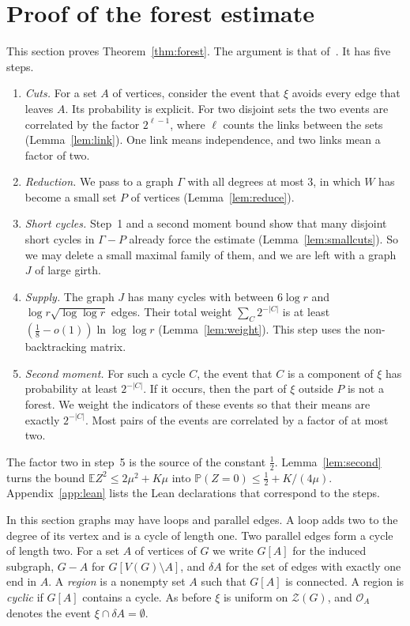 \documentclass[11pt]{article}
\theoremstyle{definition}
\theoremstyle{remark}
\newcommand{\Z}{\mathcal{Z}}
\newcommand{\PP}{\mathbb{P}}
\newcommand{\EE}{\mathbb{E}}
\newcommand{\sm}{\setminus}
\newcommand{\half}{\tfrac12}
\newcommand{\cO}{\mathcal{O}}
\numberwithin{equation}{section}
\begin{document}
\section{Proof of the forest estimate}\label{sec:forest}

This section proves Theorem~\ref{thm:forest}. The argument is that of~\cite{KNT}. It has five steps.
\begin{enumerate}
\item \emph{Cuts.} For a set $A$ of vertices, consider the event that $\xi$ avoids every edge that
leaves $A$. Its probability is explicit. For two disjoint sets the two events are correlated by the
factor $2^{\ell-1}$, where $\ell$ counts the links between the sets (Lemma~\ref{lem:link}). One link
means independence, and two links mean a factor of two.
\item \emph{Reduction.} We pass to a graph $\Gamma$ with all degrees at most $3$, in which $W$ has
become a small set $P$ of vertices (Lemma~\ref{lem:reduce}).
\item \emph{Short cycles.} Step~1 and a second moment bound show that many disjoint short cycles in
$\Gamma-P$ already force the estimate (Lemma~\ref{lem:smallcuts}). So we may delete a small maximal
family of them, and we are left with a graph $J$ of large girth.
\item \emph{Supply.} The graph $J$ has many cycles with between $6\log r$ and
$\log r\sqrt{\log\log r}$ edges. Their total weight $\sum_C2^{-|C|}$ is at least
$(\frac18-o(1))\ln\log\log r$ (Lemma~\ref{lem:weight}). This step uses the non-backtracking matrix.
\item \emph{Second moment.} For such a cycle $C$, the event that $C$ is a component of $\xi$ has
probability at least $2^{-|C|}$. If it occurs, then the part of $\xi$ outside $P$ is not a forest.
We weight the indicators of these events so that their means are exactly $2^{-|C|}$. Most pairs of
the events are correlated by a factor of at most two.
\end{enumerate}
The factor two in step~5 is the source of the constant $\half$. Lemma~\ref{lem:second} turns the
bound $\EE Z^{2}\le2\mu^{2}+K\mu$ into $\PP(Z=0)\le\half+K/(4\mu)$. Appendix~\ref{app:lean} lists the
Lean declarations that correspond to the steps.

In this section graphs may have loops and parallel edges. A loop adds two to the degree of its vertex
and is a cycle of length one. Two parallel edges form a cycle of length two. For a set $A$ of
vertices of $G$ we write $G[A]$ for the induced subgraph, $G-A$ for $G[V(G)\sm A]$, and $\delta A$
for the set of edges with exactly one end in $A$. A \emph{region} is a nonempty set $A$ such that
$G[A]$ is connected. A region is \emph{cyclic} if $G[A]$ contains a cycle. As before $\xi$ is
uniform on $\Z(G)$, and $\cO_A$ denotes the event $\xi\cap\delta A=\emptyset$.
\end{document}
